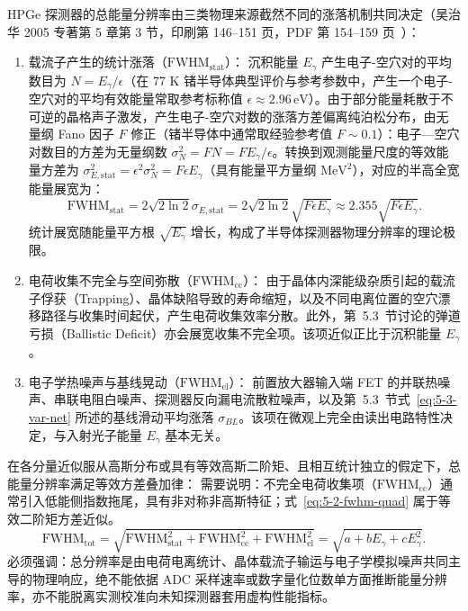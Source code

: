 HPGe 探测器的总能量分辨率由三类物理来源截然不同的涨落机制共同决定（吴治华 2005 专著第 5 章第 3 节，印刷第 146–151 页，PDF 第 154–159 页~\cite{book-wu-nuclear-experiment-methods}）：
\begin{enumerate}
\item 载流子产生的统计涨落（$\mathrm{FWHM}_{\mathrm{stat}}$）：
沉积能量 $E_\gamma$ 产生电子-空穴对的平均数目为 $N = E_\gamma / \epsilon$（在 77 K 锗半导体典型评价与参考参数中，产生一个电子-空穴对的平均有效能量常取参考标称值 $\epsilon \approx 2.96\,\text{eV}$）。由于部分能量耗散于不可逆的晶格声子激发，产生电子-空穴对数的涨落方差偏离纯泊松分布，由无量纲 Fano 因子 $F$ 修正（锗半导体中通常取经验参考值 $F \sim 0.1$）：电子—空穴对数目的方差为无量纲数 $\sigma_N^2 = F N = F E_\gamma / \epsilon$。转换到观测能量尺度的等效能量方差为 $\sigma_{E, \mathrm{stat}}^2 = \epsilon^2 \sigma_N^2 = F \epsilon E_\gamma$（具有能量平方量纲 $\mathrm{MeV}^2$），对应的半高全宽能量展宽为：
\begin{equation}\label{eq:5-2-fwhm-stat}
\mathrm{FWHM}_{\mathrm{stat}} = 2\sqrt{2\ln 2} \sigma_{E, \mathrm{stat}} = 2\sqrt{2\ln 2} \sqrt{F \epsilon E_\gamma} \approx 2.355 \sqrt{F \epsilon E_\gamma}.
\end{equation}
统计展宽随能量平方根 $\sqrt{E_\gamma}$ 增长，构成了半导体探测器物理分辨率的理论极限。
\item 电荷收集不完全与空间弥散（$\mathrm{FWHM}_{\mathrm{cc}}$）：
由于晶体内深能级杂质引起的载流子俘获（Trapping）、晶体缺陷导致的寿命缩短，以及不同电离位置的空穴漂移路径与收集时间起伏，产生电荷收集效率分散。此外，第~5.3~节讨论的弹道亏损（Ballistic Deficit）亦会展宽收集不完全项。该项近似正比于沉积能量 $E_\gamma$。
\item 电子学热噪声与基线晃动（$\mathrm{FWHM}_{\mathrm{el}}$）：
前置放大器输入端 FET 的并联热噪声、串联电阻白噪声、探测器反向漏电流散粒噪声，以及第~5.3~节式~\eqref{eq:5-3-var-net} 所述的基线滑动平均涨落 $\sigma_{BL}$。该项在微观上完全由读出电路特性决定，与入射光子能量 $E_\gamma$ 基本无关。
\end{enumerate}

在各分量近似服从高斯分布或具有等效高斯二阶矩、且相互统计独立的假定下，总能量分辨率满足等效方差叠加律：
需要说明：不完全电荷收集项（$\mathrm{FWHM}_{\mathrm{cc}}$）通常引入低能侧指数拖尾，具有非对称非高斯特征；式~\eqref{eq:5-2-fwhm-quad} 属于等效二阶矩方差近似。
\begin{equation}\label{eq:5-2-fwhm-quad}
\mathrm{FWHM}_{\mathrm{tot}} = \sqrt{\mathrm{FWHM}_{\mathrm{stat}}^2 + \mathrm{FWHM}_{\mathrm{cc}}^2 + \mathrm{FWHM}_{\mathrm{el}}^2} = \sqrt{a + b E_\gamma + c E_\gamma^2}.
\end{equation}
必须强调：总分辨率是由电荷电离统计、晶体载流子输运与电子学模拟噪声共同主导的物理响应，绝不能依据 ADC 采样速率或数字量化位数单方面推断能量分辨率，亦不能脱离实测校准向未知探测器套用虚构性能指标。

